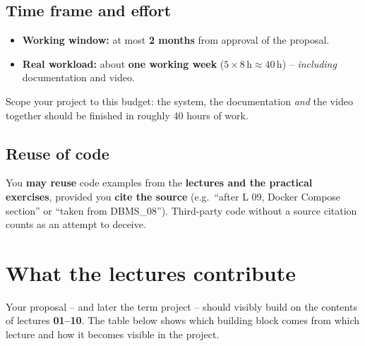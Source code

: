 \documentclass[11pt,a4paper]{article}
\begin{document}
\subsection{Time frame and effort}

\begin{itemize}[leftmargin=1.4em, topsep=2pt]
  \item \textbf{Working window:} at most \textbf{2 months} from approval of the
        proposal.
  \item \textbf{Real workload:} about \textbf{one working week}
        ($5 \times 8\,\text{h} \approx 40\,\text{h}$) --
        \emph{including} documentation and video.
\end{itemize}

Scope your project to this budget: the system, the documentation \emph{and} the
video together should be finished in roughly 40 hours of work.

\subsection{Reuse of code}

You \textbf{may reuse} code examples from the \textbf{lectures and the practical
exercises}, provided you \textbf{cite the source} (e.g.\ ``after L 09, Docker
Compose section'' or ``taken from DBMS\_08''). Third-party code without a source
citation counts as an attempt to deceive.

\section{What the lectures contribute}

Your proposal -- and later the term project -- should visibly build on the
contents of lectures \textbf{01--10}. The table below shows which building block
comes from which lecture and how it becomes visible in the project.
\end{document}
